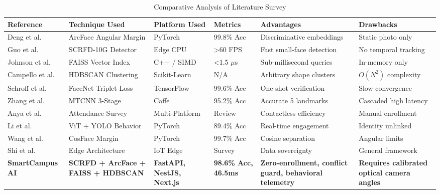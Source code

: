 \begin{table}[h]
\centering
\caption{Comparative Analysis of Literature Survey}
\label{tab:comparative_lit}
\vspace{2mm}
\setlength{\tabcolsep}{3pt}
\begin{tabular}{p{2.8cm} p{2.2cm} p{2.0cm} p{1.6cm} p{2.8cm} p{2.8cm}}
\toprule
\textbf{Reference} & \textbf{Technique Used} & \textbf{Platform Used} & \textbf{Metrics} & \textbf{Advantages} & \textbf{Drawbacks} \\
\midrule
Deng et al. \cite{deng2019arcface} & ArcFace Angular Margin & PyTorch & 99.8\% Acc & Discriminative embeddings & Static photo only \\
Guo et al. \cite{guo2021sample} & SCRFD-10G Detector & Edge CPU & >60 FPS & Fast small-face detection & No temporal tracking \\
Johnson et al. \cite{johnson2019billion} & FAISS Vector Index & C++ / SIMD & <1.5 $\mu$s & Sub-millisecond queries & In-memory only \\
Campello et al. \cite{campello2013density} & HDBSCAN Clustering & Scikit-Learn & N/A & Arbitrary shape clusters & $O(N^2)$ complexity \\
Schroff et al. \cite{schroff2015facenet} & FaceNet Triplet Loss & TensorFlow & 99.6\% Acc & One-shot verification & Slow convergence \\
Zhang et al. \cite{zhang2016joint} & MTCNN 3-Stage & Caffe & 95.2\% Acc & Accurate 5 landmarks & Cascaded high latency \\
Anya et al. \cite{anya2022automated} & Attendance Survey & Multi-Platform & Review & Contactless efficiency & Manual enrollment \\
Li et al. \cite{li2023realtime} & ViT + YOLO Behavior & PyTorch & 89.4\% Acc & Real-time engagement & Identity unlinked \\
Wang et al. \cite{wang2018cosface} & CosFace Margin & PyTorch & 99.7\% Acc & Cosine separation & Angular limits \\
Shi et al. \cite{shi2016edge} & Edge Architecture & IoT Edge & Survey & Data sovereignty & General framework \\
\midrule
\textbf{SmartCampus AI} & \textbf{SCRFD + ArcFace + FAISS + HDBSCAN} & \textbf{FastAPI, NestJS, Next.js} & \textbf{98.6\% Acc, 46.5ms} & \textbf{Zero-enrollment, conflict guard, behavioral telemetry} & \textbf{Requires calibrated optical camera angles} \\
\bottomrule
\end{tabular}
\end{table}

